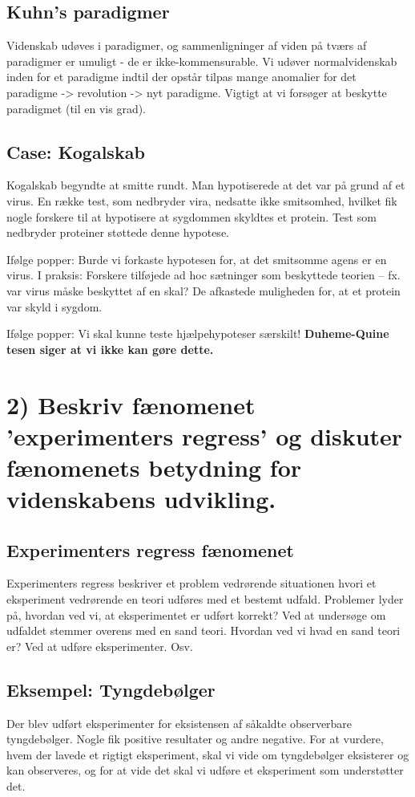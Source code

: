 \documentclass[a4paper,oneside,12pt]{memoir}
\begin{document}
\subsection{Kuhn's paradigmer}
Videnskab udøves i paradigmer, og sammenligninger af viden på tværs af paradigmer er umuligt - de er ikke-kommensurable.
Vi udøver normalvidenskab inden for et paradigme indtil der opstår tilpas mange anomalier for det paradigme -> revolution -> nyt paradigme. Vigtigt at vi forsøger at beskytte paradigmet (til en vis grad).


\subsection{Case: Kogalskab}
Kogalskab begyndte at smitte rundt. Man hypotiserede at det var på grund af et virus. En række test, som nedbryder vira, nedsatte ikke smitsomhed, hvilket fik nogle forskere til at hypotisere at sygdommen skyldtes et protein. Test som nedbryder proteiner støttede denne hypotese.

Ifølge popper: Burde vi forkaste hypotesen for, at det smitsomme agens er en virus. I praksis: Forskere tilføjede ad hoc sætninger som beskyttede teorien -- fx. var virus måske beskyttet af en skal? De afkastede muligheden for, at et protein var skyld i sygdom.

Ifølge popper: Vi skal kunne teste hjælpehypoteser særskilt! \textbf{Duheme-Quine tesen siger at vi ikke kan gøre dette.}
\newpage
\section{2) Beskriv fænomenet 'experimenters regress' og diskuter fænomenets betydning for videnskabens udvikling.}
\subsection{Experimenters regress fænomenet}
Experimenters regress beskriver et problem vedrørende situationen hvori et eksperiment vedrørende en teori udføres med et bestemt udfald. Problemer lyder på, hvordan ved vi, at eksperimentet er udført korrekt? Ved at undersøge om udfaldet stemmer overens med en sand teori. Hvordan ved vi hvad en sand teori er? Ved at udføre eksperimenter. Osv.

\subsection{Eksempel: Tyngdebølger}
Der blev udført eksperimenter for eksistensen af såkaldte observerbare tyngdebølger. Nogle fik positive resultater og andre negative. For at vurdere, hvem der lavede et rigtigt eksperiment, skal vi vide om tyngdebølger eksisterer og kan observeres, og for at vide det skal vi udføre et eksperiment som understøtter det.
\end{document}
